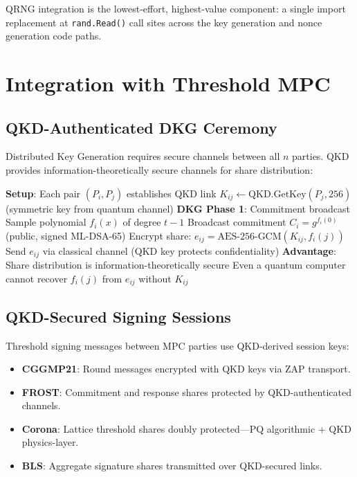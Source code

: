 \documentclass[11pt,letterpaper]{article}
\begin{document}
QRNG integration is the lowest-effort, highest-value component: a single import replacement at \texttt{rand.Read()} call sites across the key generation and nonce generation code paths.

\section{Integration with Threshold MPC}

\subsection{QKD-Authenticated DKG Ceremony}

Distributed Key Generation requires secure channels between all $n$ parties. QKD provides information-theoretically secure channels for share distribution:

\begin{algorithm}[H]
\caption{QKD-Authenticated Threshold Key Generation}
\begin{algorithmic}[1]
\State \textbf{Setup}: Each pair $(P_i, P_j)$ establishes QKD link
\State \quad $K_{ij} \gets \text{QKD.GetKey}(P_j, 256)$ (symmetric key from quantum channel)
\Statex
\State \textbf{DKG Phase 1}: Commitment broadcast
  \State Sample polynomial $f_i(x)$ of degree $t-1$
  \State Broadcast commitment $C_i = g^{f_i(0)}$ (public, signed ML-DSA-65)
    \State Encrypt share: $e_{ij} = \text{AES-256-GCM}(K_{ij}, f_i(j))$
    \State Send $e_{ij}$ via classical channel (QKD key protects confidentiality)
  \EndFor
\EndFor
\Statex
\State \textbf{Advantage}: Share distribution is information-theoretically secure
\State Even a quantum computer cannot recover $f_i(j)$ from $e_{ij}$ without $K_{ij}$
\end{algorithmic}
\end{algorithm}

\subsection{QKD-Secured Signing Sessions}

Threshold signing messages between MPC parties use QKD-derived session keys:

\begin{itemize}
\item \textbf{CGGMP21}: Round messages encrypted with QKD keys via ZAP transport.
\item \textbf{FROST}: Commitment and response shares protected by QKD-authenticated channels.
\item \textbf{Corona}: Lattice threshold shares doubly protected---PQ algorithmic + QKD physics-layer.
\item \textbf{BLS}: Aggregate signature shares transmitted over QKD-secured links.
\end{itemize}
\end{document}
